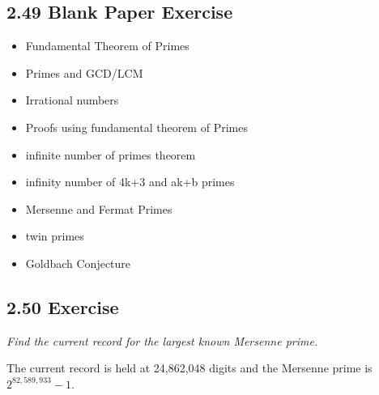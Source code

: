 \documentclass{article}
\begin{document}
\subsection*{2.49 Blank Paper Exercise} 
\begin{itemize}
    \item Fundamental Theorem of Primes
    \item Primes and GCD/LCM
    \item Irrational numbers
    \item Proofs using fundamental theorem of Primes
    \item infinite number of primes theorem
    \item infinity number of 4k+3 and ak+b primes
    \item Mersenne and Fermat Primes
    \item twin primes
    \item Goldbach Conjecture
\end{itemize}

\subsection*{2.50 Exercise} 
\quad \textit{Find the current record for the largest known Mersenne prime.}

The current record is held at 24,862,048 digits and the Mersenne prime is $2^{82,589,933}-1$.
\end{document}
